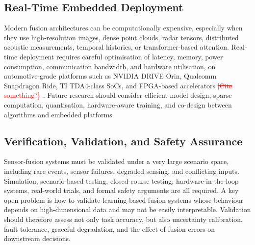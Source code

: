 \documentclass{ieeeaccess}
\newcommand{\deleted}[1]{\textcolor{red}{\sout{#1}}}
\newcommand{\addednew}[1]{\textcolor{RevisionOlive}{#1}}
\begin{document}
\subsection{Real-Time Embedded Deployment}

Modern fusion architectures can be computationally expensive, especially when they use high-resolution images, dense point clouds, radar tensors, distributed acoustic measurements, temporal histories, or transformer-based attention. Real-time deployment requires careful optimisation of latency, memory, power consumption, communication bandwidth, and hardware utilisation, on automotive-grade platforms such as NVIDIA DRIVE Orin, Qualcomm Snapdragon Ride, TI TDA4-class SoCs, and FPGA-based accelerators\deleted{ [Cite something?]}\addednew{~\cite{lin2018_architectural,liu2019_edge_computing,sze2017_efficient}}. Future research should consider efficient model design, sparse computation, quantisation, hardware-aware training, and co-design between algorithms and embedded platforms.

\subsection{Verification, Validation, and Safety Assurance}

Sensor-fusion systems must be validated under a very large scenario space, including rare events, sensor failures, degraded sensing, and conflicting inputs. Simulation, scenario-based testing, closed-course testing, hardware-in-the-loop systems, real-world trials, and formal safety arguments are all required. A key open problem is how to validate learning-based fusion systems whose behaviour depends on high-dimensional data and may not be easily interpretable. Validation should therefore assess not only task accuracy, but also uncertainty calibration, fault tolerance, graceful degradation, and the effect of fusion errors on downstream decisions.
\end{document}
